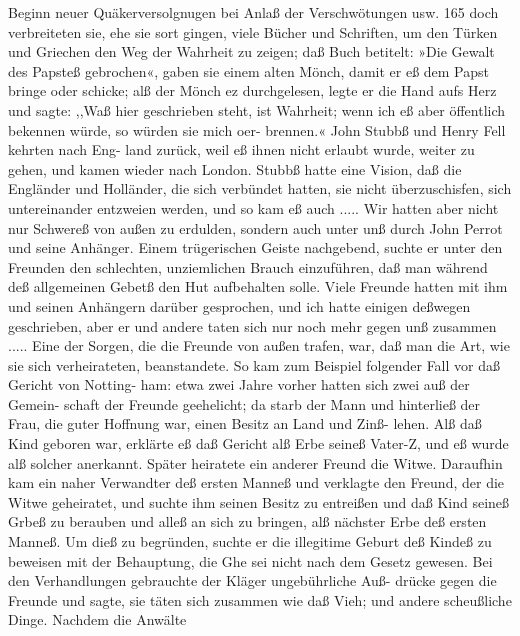Beginn neuer Quäkerversolgnugen bei Anlaß der Verschwötungen usw. 165
doch verbreiteten sie, ehe sie sort gingen, viele Bücher und Schriften,
um den Türken und Griechen den Weg der Wahrheit zu zeigen;
daß Buch betitelt: »Die Gewalt des Papsteß gebrochen«, gaben
sie einem alten Mönch, damit er eß dem Papst bringe oder
schicke; alß der Mönch ez durchgelesen, legte er die Hand aufs
Herz und sagte: ,,Waß hier geschrieben steht, ist Wahrheit; wenn
ich eß aber öffentlich bekennen würde, so würden sie mich oer-
brennen.« John Stubbß und Henry Fell kehrten nach Eng-
land zurück, weil eß ihnen nicht erlaubt wurde, weiter zu gehen,
und kamen wieder nach London. Stubbß hatte eine Vision, daß
die Engländer und Holländer, die sich verbündet hatten, sie nicht
überzuschisfen, sich untereinander entzweien werden, und so kam
eß auch .....
Wir hatten aber nicht nur Schwereß von außen zu erdulden,
sondern auch unter unß durch John Perrot und seine Anhänger.
Einem trügerischen Geiste nachgebend, suchte er unter den Freunden
den schlechten, unziemlichen Brauch einzuführen, daß man während
deß allgemeinen Gebetß den Hut aufbehalten solle. Viele Freunde
hatten mit ihm und seinen Anhängern darüber gesprochen, und
ich hatte einigen deßwegen geschrieben, aber er und andere taten
sich nur noch mehr gegen unß zusammen .....
Eine der Sorgen, die die Freunde von außen trafen, war,
daß man die Art, wie sie sich verheirateten, beanstandete. So
kam zum Beispiel folgender Fall vor daß Gericht von Notting-
ham: etwa zwei Jahre vorher hatten sich zwei auß der Gemein-
schaft der Freunde geehelicht; da starb der Mann und hinterließ
der Frau, die guter Hoffnung war, einen Besitz an Land und Zinß-
lehen. Alß daß Kind geboren war, erklärte eß daß Gericht alß
Erbe seineß Vater-Z, und eß wurde alß solcher anerkannt. Später
heiratete ein anderer Freund die Witwe. Daraufhin kam ein
naher Verwandter deß ersten Manneß und verklagte den Freund,
der die Witwe geheiratet, und suchte ihm seinen Besitz zu entreißen
und daß Kind seineß Grbeß zu berauben und alleß an sich zu
bringen, alß nächster Erbe deß ersten Manneß. Um dieß zu
begründen, suchte er die illegitime Geburt deß Kindeß zu beweisen
mit der Behauptung, die Ghe sei nicht nach dem Gesetz gewesen.
Bei den Verhandlungen gebrauchte der Kläger ungebührliche Auß-
drücke gegen die Freunde und sagte, sie täten sich zusammen wie
daß Vieh; und andere scheußliche Dinge. Nachdem die Anwälte



